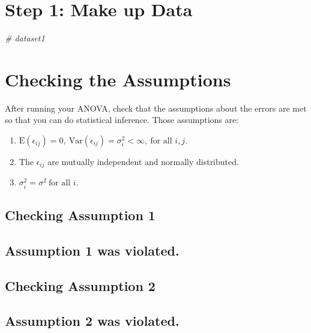 \documentclass[
]{book}
\newenvironment{Shaded}{\begin{snugshade}}{\end{snugshade}}
\newcommand{\CommentTok}[1]{\textcolor[rgb]{0.56,0.35,0.01}{\textit{#1}}}
\providecommand{\tightlist}{%
  \setlength{\itemsep}{0pt}\setlength{\parskip}{0pt}}
\begin{document}
\hypertarget{step-1-make-up-data}{%
\section{Step 1: Make up Data}\label{step-1-make-up-data}}

\begin{Shaded}
\begin{Highlighting}[]
\CommentTok{\# dataset1}
\end{Highlighting}
\end{Shaded}

\hypertarget{checking-the-assumptions}{%
\section{Checking the Assumptions}\label{checking-the-assumptions}}

After running your ANOVA, check that the assumptions about the errors
are met so that you can do statistical inference. Those assumptions are:

\begin{enumerate}
\def\labelenumi{\arabic{enumi}.}
\tightlist
\item
  \(\text{E}(\epsilon_{ij})=0,\ \text{Var}(\epsilon_{ij})=\sigma_{i}^2 < \infty,\ \text{for all }i, j.\)
\item
  The \(\epsilon_{ij}\) are mutually independent and normally
  distributed.
\item
  \(\sigma_{i}^2=\sigma^2\ \text{for all } i.\)
\end{enumerate}

\hypertarget{checking-assumption-1}{%
\subsection{Checking Assumption 1}\label{checking-assumption-1}}

\hypertarget{assumption-1-was-violated.}{%
\subsection{Assumption 1 was violated.}\label{assumption-1-was-violated.}}

\hypertarget{checking-assumption-2}{%
\subsection{Checking Assumption 2}\label{checking-assumption-2}}

\hypertarget{assumption-2-was-violated.}{%
\subsection{Assumption 2 was violated.}\label{assumption-2-was-violated.}}
\end{document}
